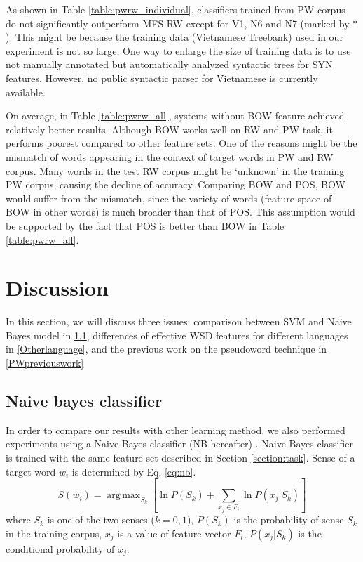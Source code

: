 \documentclass[english]{jnlp_1.4}
\DeclareMathOperator*{\argmax}{arg\,max}
\begin{document}
As shown in Table \ref{table:pwrw_individual}, 
classifiers trained from PW corpus do not significantly outperform MFS-RW except for V1,
N6 and N7 (marked by $*$). 
This might be because the training data (Vietnamese Treebank) used in our experiment is not so large. 
One way to enlarge the size of training data is to use not manually annotated but automatically analyzed syntactic trees for SYN features.
However, no public syntactic parser for Vietnamese is currently available.

On average,
in Table \ref{table:pwrw_all},
systems without BOW feature achieved relatively better results.
Although BOW works well on RW and PW task, 
it performs poorest compared to other feature sets.
One of the reasons might be
the mismatch of words appearing in the context of target words in PW
and RW corpus. Many words in the test RW corpus might be `unknown'
in the training PW corpus, causing the decline of accuracy.
Comparing BOW and POS, BOW would suffer from the mismatch,
since the variety of words (feature space of BOW in other words) is
much broader than that of POS. This assumption would be supported by the
fact that POS is better than BOW in Table \ref{table:pwrw_all}.



\section{Discussion} \label{section:discuss}
In this section, we will discuss three issues:
comparison between SVM and Naive Bayes model in \ref{NBclassifier}, 
differences of effective WSD features for different languages in \ref{Otherlanguage},
and the previous work on the pseudoword technique in \ref{PWpreviouswork}

\subsection{Naive bayes classifier} \label{NBclassifier}
In order to compare our results with other learning method, we also performed experiments using a Naive Bayes classifier (NB hereafter) \cite{duda:01}.
Naive Bayes classifier is trained with the same feature set described in Section \ref{section:task}.
Sense of a target word $w_i$ is determined by Eq. \eqref{eq:nb}.
\begin{equation}\label{eq:nb}
S(w_i) = \argmax_{S_k} \left[ \ln P(S_k) + \sum_{x_j \in F_i} \ln P(x_j | S_k) \right]
\end{equation}
where $S_k$ is one of the two senses ($k={0,1}$), 
$P(S_k)$ is the probability of sense $S_k$ in the training corpus,
$x_j$ is a value of feature vector $F_i$,
$P(x_j | S_k)$ is the conditional probability of $x_j$.
\end{document}
